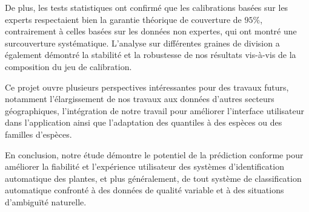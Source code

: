 \documentclass[a4paper,12pt]{article}
\begin{document}
\vspace{0.2cm}

De plus, les tests statistiques ont confirmé que les calibrations basées sur les experts respectaient bien la garantie théorique de couverture de $95\%$, contrairement à celles basées sur les données non expertes, qui ont montré une surcouverture systématique. L’analyse sur différentes graines de division a également démontré la stabilité et la robustesse de nos résultats vis-à-vis de la composition du jeu de calibration.

\vspace{0.2cm}

Ce projet ouvre plusieurs perspectives intéressantes pour des travaux futurs, notamment l'élargissement de nos travaux aux données d'autres secteurs géographiques, l'intégration de notre travail pour améliorer l'interface utilisateur dans l'application ainsi que l'adaptation des quantiles à des espèces ou des familles d'espèces.

\vspace{0.2cm}

En conclusion, notre étude démontre le potentiel de la prédiction conforme pour améliorer la fiabilité et l'expérience utilisateur des systèmes d'identification automatique des plantes, et plus généralement, de tout système de classification automatique confronté à des données de qualité variable et à des situations d'ambiguïté naturelle.

\printbibliography
\end{document}
